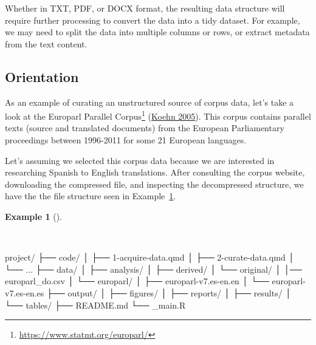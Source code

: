 \documentclass[
  letterpaper,
  DIV=11,
  numbers=noendperiod]{scrreport}
\newenvironment{Shaded}{\begin{snugshade}}{\end{snugshade}}
\newcommand{\ExtensionTok}[1]{\textcolor[rgb]{0.00,0.00,0.00}{#1}}
\newcommand{\NormalTok}[1]{\textcolor[rgb]{0.00,0.00,0.00}{#1}}
\theoremstyle{definition}
\newtheorem{example}{Example}[chapter]
\theoremstyle{remark}
\DeclareRobustCommand{\href}[2]{#2\footnote{\url{#1}}}
\begin{document}
Whether in TXT, PDF, or DOCX format, the resulting data structure will
require further processing to convert the data into a tidy dataset. For
example, we may need to split the data into multiple columns or rows, or
extract metadata from the text content.

\hypertarget{orientation}{%
\subsection{Orientation}\label{orientation}}

As an example of curating an unstructured source of corpus data, let's
take a look at the \href{https://www.statmt.org/europarl/}{Europarl
Parallel Corpus} (\protect\hyperlink{ref-Koehn2005}{Koehn 2005}). This
corpus contains parallel texts (source and translated documents) from
the European Parliamentary proceedings between 1996-2011 for some 21
European languages.

Let's assuming we selected this corpus data because we are interested in
researching Spanish to English translations. After consulting the corpus
website, downloading the compressed file, and inspecting the
decompressed structure, we have the the file structure seen in
Example~\ref{exm-cd-europarl-file-structure}.

\begin{example}[]\protect\hypertarget{exm-cd-europarl-file-structure}{}\label{exm-cd-europarl-file-structure}

~

\begin{Shaded}
\begin{Highlighting}[]
\ExtensionTok{project/}
\ExtensionTok{├──}\NormalTok{ code/}
\ExtensionTok{│}\NormalTok{   ├── 1{-}acquire{-}data.qmd}
\ExtensionTok{│}\NormalTok{   ├── 2{-}curate{-}data.qmd}
\ExtensionTok{│}\NormalTok{   └── ...}
\ExtensionTok{├──}\NormalTok{ data/}
\ExtensionTok{│}\NormalTok{   ├── analysis/}
\ExtensionTok{│}\NormalTok{   ├── derived/}
\ExtensionTok{│}\NormalTok{   └── original/}
\ExtensionTok{│}\NormalTok{       │── europarl\_do.csv}
\ExtensionTok{│}\NormalTok{       └── europarl/}
\ExtensionTok{│}\NormalTok{           ├── europarl{-}v7.es{-}en.en}
\ExtensionTok{│}\NormalTok{           └── europarl{-}v7.es{-}en.es}
\ExtensionTok{├──}\NormalTok{ output/}
\ExtensionTok{│}\NormalTok{   ├── figures/}
\ExtensionTok{│}\NormalTok{   ├── reports/}
\ExtensionTok{│}\NormalTok{   ├── results/}
\ExtensionTok{│}\NormalTok{   └── tables/}
\ExtensionTok{├──}\NormalTok{ README.md}
\ExtensionTok{└──}\NormalTok{ \_main.R}
\end{Highlighting}
\end{Shaded}

\end{example}
\end{document}
